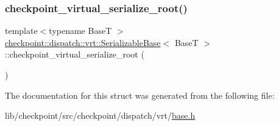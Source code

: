 \subsubsection{\texorpdfstring{checkpoint\+\_\+virtual\+\_\+serialize\+\_\+root()}{checkpoint\_virtual\_serialize\_root()}}
{\footnotesize\ttfamily template$<$typename BaseT $>$ \\
\hyperlink{structcheckpoint_1_1dispatch_1_1vrt_1_1_serializable_base}{checkpoint\+::dispatch\+::vrt\+::\+Serializable\+Base}$<$ BaseT $>$\+::checkpoint\+\_\+virtual\+\_\+serialize\+\_\+root (\begin{DoxyParamCaption}{ }\end{DoxyParamCaption})\hspace{0.3cm}{\ttfamily [inline]}}



The documentation for this struct was generated from the following file\+:\begin{DoxyCompactItemize}
\item 
lib/checkpoint/src/checkpoint/dispatch/vrt/\hyperlink{lib_2checkpoint_2src_2checkpoint_2dispatch_2vrt_2base_8h}{base.\+h}\end{DoxyCompactItemize}
